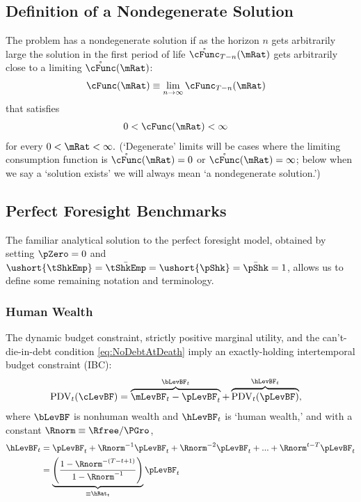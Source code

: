 \documentclass[BufferStockTheory]{subfiles}
\begin{document}
\hypertarget{Definition-of-a-Nondegenerate-Solution}{}
\subsection{Definition of a Nondegenerate Solution}

The problem has a nondegenerate solution if as the horizon $n$ gets arbitrarily large the solution in the first period of life $\mathring{\cFunc}_{T-n}(\mRat)$ gets arbitrarily close to a limiting $\mathring{\cFunc}(\mRat)$:
\begin{align}
  \cFunc(\mRat)  & \equiv  \lim_{n \rightarrow \infty} \cFunc_{T-n}(\mRat)
\end{align}
that satisfies
\begin{align}
  0 & < \cFunc(\mRat) <  \infty 
\end{align}
for every $0 < \mRat < \infty.$ (`Degenerate' limits will be cases where the limiting consumption function is $\mathring{\cFunc}(\mRat)=0$ or $\mathring{\cFunc}(\mRat)=\infty$; below when we say a `solution exists' we will always mean `a nondegenerate solution.')

\hypertarget{Perfect-Foresight-Benchmarks}{}
\subsection{Perfect Foresight Benchmarks}

The familiar analytical solution to the perfect foresight model, obtained by setting $\pZero=0$ and $\ushort{\tShkEmp}=\bar{\tShkEmp}=\ushort{\pShk}=\bar{\pShk}=1$, allows us to define some remaining notation and terminology.

\hypertarget{Human-Wealth}{}
\subsubsection{Human Wealth}
The dynamic budget constraint, strictly positive marginal utility, and the can't-die-in-debt condition \eqref{eq:NoDebtAtDeath} imply an exactly-holding intertemporal budget constraint (IBC):
\begin{align}
  \mathrm{PDV}_{t}(\cLevBF)  & = \overbrace{\mLevBF_{t}-\pLevBF_{t}}^{\bLevBF_{t}}+\overbrace{\mathrm{PDV}_{t}(\pLevBF)}^{\hLevBF_{t}}, \label{eq:IBCFinite}
\end{align} \hypertarget{FHWF}{}
where $\bLevBF$ is nonhuman wealth and $\hLevBF_{t}$ is `human wealth,' and with a constant $\Rnorm \equiv \Rfree/\PGro$,
\begin{align}
  \hLevBF_{t}  & = \pLevBF_{t}+\Rnorm^{-1} \pLevBF_{t} + \Rnorm^{-2} \pLevBF_{t} + ... + \Rnorm^{t-T} \pLevBF_{t} \notag 
  \\  & = \underbrace{\left(\frac{1-\Rnorm^{-(T-t+1)}}{1-\Rnorm^{-1}}\right)}_{\equiv \hRat_{t}}\pLevBF_{t} \label{eq:HDef}
\end{align}
\end{document}
